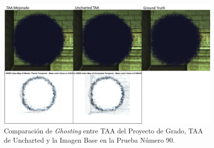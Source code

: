 \documentclass[pregrado]{tesis-usb} %
\begin{document}
\begin{figure}[!htb]
	\centering
	\includegraphics[scale=0.8]{images/results/hairball_ghosting_shadow.png}
	\caption{Comparación de \textit{Ghosting} entre TAA del Proyecto de Grado, TAA de Uncharted y la Imagen Base en la Prueba Número 90.}\label{fig:hairball_ghosting_shadow}
\end{figure}

\FloatBarrier
\end{document}
